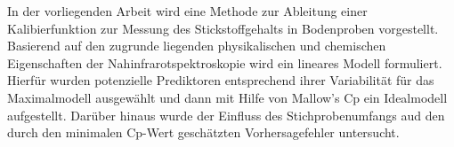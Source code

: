 In der vorliegenden Arbeit wird eine Methode zur Ableitung einer Kalibierfunktion zur Messung des Stickstoffgehalts
in Bodenproben vorgestellt. Basierend auf den zugrunde liegenden physikalischen und chemischen Eigenschaften der Nahinfrarotspektroskopie wird ein lineares Modell formuliert. 
Hierfür wurden potenzielle Prediktoren entsprechend ihrer Variabilität für das Maximalmodell ausgewählt und dann mit Hilfe von Mallow's Cp ein Idealmodell aufgestellt. 
Darüber hinaus wurde der Einfluss des Stichprobenumfangs aud den durch den minimalen Cp-Wert geschätzten Vorhersagefehler untersucht.